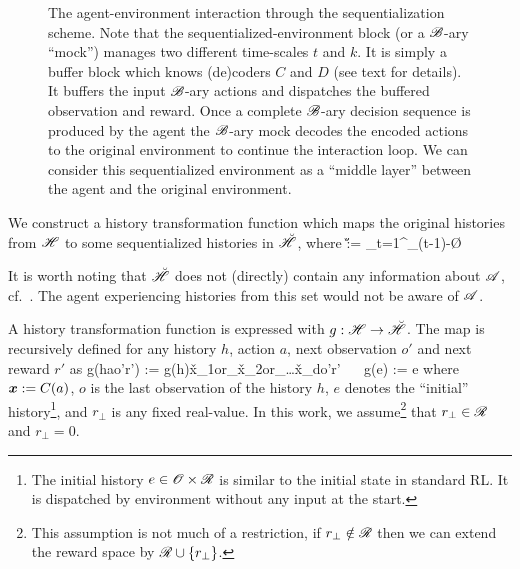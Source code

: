 \documentclass{article} %
\let\defOrg\definition
\let\enddefOrg\enddefinition
\renewenvironment{definition}{\begin{tcolorbox}\defOrg}{\enddefOrg\end{tcolorbox}}
\begin{document}
\begin{figure}[!ht]
    \caption{The agent-environment interaction through the sequentialization scheme. Note that the sequentialized-environment block (or a $\mathscr{B}$-ary ``mock'') manages two different time-scales $t$ and $k$. It is simply a buffer block which knows (de)coders $C$ and $D$ (see text for details). It buffers the input $\mathscr{B}$-ary actions and dispatches the buffered observation and reward. Once a complete $\mathscr{B}$-ary decision sequence is produced by the agent the $\mathscr{B}$-ary mock decodes the encoded actions to the original environment to continue the interaction loop. We can consider this sequentialized environment as a ``middle layer'' between the agent and the original environment.}
    \label{fig:bianary-interaction}
\end{figure}


We construct a history transformation function which maps the original histories from $\mathscr{H}$ to some sequentialized histories in $\breve{\mathscr{H}}$, where
\beq
\u \H := \bigcup_{t=1}^\infty \underbrace{\O \times \R \times \B \times \dots \times \O \times \R \times \B}_{(t-1)-}\times\O\times\R
\eeq

It is worth noting that $\breve{\mathscr{H}}$ does not (directly) contain any information about $\mathscr{A}$, cf.\ . The agent experiencing histories from this set would not be aware of $\mathscr{A}$.

\begin{definition}[History transformation function]
    A history transformation function is expressed with $g : \mathscr{H} \to \breve{\mathscr{H}}$. The map is recursively defined for any history $h$, action $a$, next observation $o'$ and next reward $r'$ as
    \beq
    g(hao'r') := g(h)\v x_1or_\bot\v x_2or_\bot \dots \v x_do'r' \  \ g(e) := e
    \eeq
    where $\boldsymbol{x} := C(a)$, $o$ is the last observation of the history $h$, $e$ denotes the ``initial'' history\footnote{The initial history $e \in \mathscr{O} \times \mathscr{R}$ is similar to the initial state in standard RL. It is dispatched by environment without any input at the start.}, and $r_\bot$ is any fixed real-value. In this work, we assume\footnote{This assumption is not much of a restriction, if $r_\bot \notin \mathscr{R}$ then we can extend the reward space by $\mathscr{R} \cup \{r_\bot\}$.} that $r_\bot \in \mathscr{R}$ and $r_\bot = 0$.
\end{definition}
\end{document}
